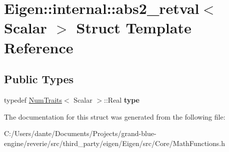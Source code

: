 \hypertarget{struct_eigen_1_1internal_1_1abs2__retval}{}\section{Eigen\+::internal\+::abs2\+\_\+retval$<$ Scalar $>$ Struct Template Reference}
\label{struct_eigen_1_1internal_1_1abs2__retval}
\subsection*{Public Types}
\begin{DoxyCompactItemize}
\item 
\mbox{\label{struct_eigen_1_1internal_1_1abs2__retval_a9c58d3ea1a60822c36ecae2c55d7a46a}} 
typedef \mbox{\hyperlink{struct_eigen_1_1_num_traits}{Num\+Traits}}$<$ Scalar $>$\+::Real {\bfseries type}
\end{DoxyCompactItemize}


The documentation for this struct was generated from the following file\+:\begin{DoxyCompactItemize}
\item 
C\+:/\+Users/dante/\+Documents/\+Projects/grand-\/blue-\/engine/reverie/src/third\+\_\+party/eigen/\+Eigen/src/\+Core/Math\+Functions.\+h\end{DoxyCompactItemize}
